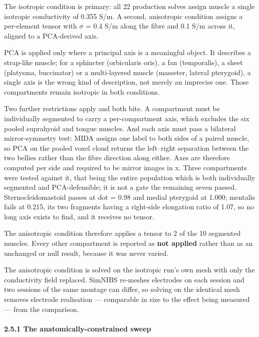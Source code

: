 \documentclass[
  11pt,
  letterpaper,
]{article}
\begin{document}
The isotropic condition is primary: all 22 production solves assign muscle a
single isotropic conductivity of 0.355 S/m. A second, anisotropic condition
assigns a per-element tensor with $\sigma$ = 0.4 S/m along the fibre and 0.1 S/m across
it, aligned to a PCA-derived axis.

PCA is applied only where a principal axis is a meaningful object. It describes
a strap-like muscle; for a sphincter (orbicularis oris), a fan (temporalis), a
sheet (platysma, buccinator) or a multi-layered muscle (masseter, lateral
pterygoid), a single axis is the wrong kind of description, not merely an
imprecise one. Those compartments remain isotropic in both conditions.

Two further restrictions apply and both bite. A compartment must be individually
segmented to carry a per-compartment axis, which excludes the six pooled
suprahyoid and tongue muscles. And each axis must pass a bilateral
mirror-symmetry test: MIDA assigns one label to both sides of a paired muscle,
so PCA on the pooled voxel cloud returns the left--right separation between the
two bellies rather than the fibre direction along either. Axes are therefore
computed per side and required to be mirror images in x. Three compartments were
tested against it, that being the entire population which is both individually
segmented and PCA-defensible; it is not a gate the remaining seven passed.
Sternocleidomastoid
passes at \textbar dot\textbar{} = 0.98 and medial pterygoid at 1.000; mentalis fails at 0.215,
its two fragments having a right-side elongation ratio of 1.07, so no long axis
exists to find, and it receives no tensor.

The anisotropic condition therefore applies a tensor to 2 of the 10 segmented
muscles. Every other compartment is reported as \textbf{not applied} rather than as
an unchanged or null result, because it was never varied.

The anisotropic condition is solved on the isotropic run's own mesh with only
the conductivity field replaced. SimNIBS re-meshes electrodes on each session
and two sessions of the same montage can differ, so solving on the identical
mesh removes electrode realisation --- comparable in size to the effect being
measured --- from the comparison.

\paragraph{2.5.1 The anatomically-constrained sweep}\label{the-anatomically-constrained-sweep}
\end{document}
